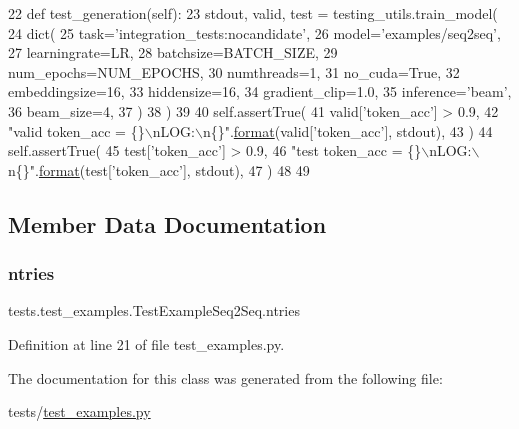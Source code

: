\begin{DoxyCode}
22     \textcolor{keyword}{def }test\_generation(self):
23         stdout, valid, test = testing\_utils.train\_model(
24             dict(
25                 task=\textcolor{stringliteral}{'integration\_tests:nocandidate'},
26                 model=\textcolor{stringliteral}{'examples/seq2seq'},
27                 learningrate=LR,
28                 batchsize=BATCH\_SIZE,
29                 num\_epochs=NUM\_EPOCHS,
30                 numthreads=1,
31                 no\_cuda=\textcolor{keyword}{True},
32                 embeddingsize=16,
33                 hiddensize=16,
34                 gradient\_clip=1.0,
35                 inference=\textcolor{stringliteral}{'beam'},
36                 beam\_size=4,
37             )
38         )
39 
40         self.assertTrue(
41             valid[\textcolor{stringliteral}{'token\_acc'}] > 0.9,
42             \textcolor{stringliteral}{"valid token\_acc = \{\}\(\backslash\)nLOG:\(\backslash\)n\{\}"}.\hyperlink{namespaceparlai_1_1chat__service_1_1services_1_1messenger_1_1shared__utils_a32e2e2022b824fbaf80c747160b52a76}{format}(valid[\textcolor{stringliteral}{'token\_acc'}], stdout),
43         )
44         self.assertTrue(
45             test[\textcolor{stringliteral}{'token\_acc'}] > 0.9,
46             \textcolor{stringliteral}{"test token\_acc = \{\}\(\backslash\)nLOG:\(\backslash\)n\{\}"}.\hyperlink{namespaceparlai_1_1chat__service_1_1services_1_1messenger_1_1shared__utils_a32e2e2022b824fbaf80c747160b52a76}{format}(test[\textcolor{stringliteral}{'token\_acc'}], stdout),
47         )
48 
49 
\end{DoxyCode}


\subsection{Member Data Documentation}
\mbox{\label{classtests_1_1test__examples_1_1TestExampleSeq2Seq_a4fab0cbc7ef41b880a229fcd895dd279}} 
\subsubsection{\texorpdfstring{ntries}{ntries}}
{\footnotesize\ttfamily tests.\+test\+\_\+examples.\+Test\+Example\+Seq2\+Seq.\+ntries\hspace{0.3cm}{\ttfamily [static]}}



Definition at line 21 of file test\+\_\+examples.\+py.



The documentation for this class was generated from the following file\+:\begin{DoxyCompactItemize}
\item 
tests/\hyperlink{test__examples_8py}{test\+\_\+examples.\+py}\end{DoxyCompactItemize}

